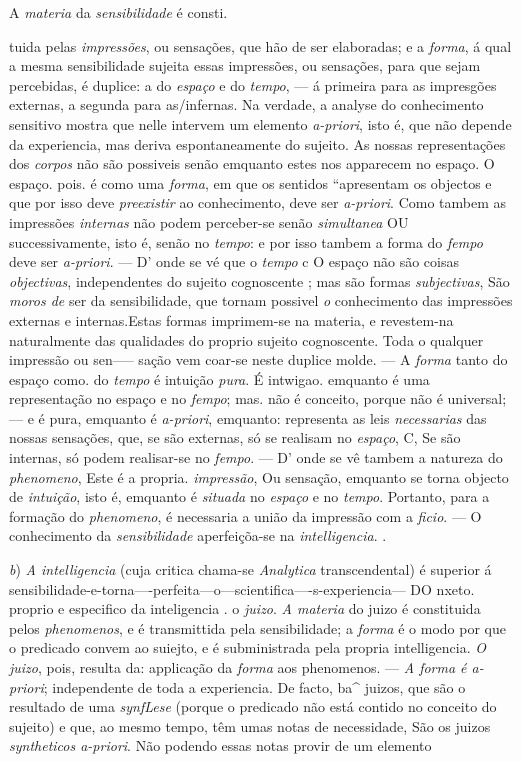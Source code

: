 A \emph{materia} da \emph{sensibilidade} é consti.\par tuida pelas \emph{impressões}, ou sensações, que hão de ser elaboradas; e a \emph{forma}, á qual a mesma sensibilidade sujeita essas impressões, ou sensações, para que sejam percebidas, é duplice: a do \emph{espaço} e do \emph{tempo}, --- á primeira para as impresgões externas, a segunda para as/infernas. Na verdade, a analyse do conhecimento sensitivo mostra que nelle intervem um elemento \emph{a-priori}, isto é, que não depende da experiencia, mas deriva espontaneamente do sujeito. As nossas representações dos \emph{corpos} não são possiveis senão emquanto estes nos apparecem no espaço. O espaço. pois. é como uma \emph{forma}, em que os sentidos “apresentam os objectos e que por isso deve \emph{preexistir} ao conhecimento, deve ser \emph{a-priori}. Como tambem as impressões \emph{internas} não podem perceber-se senão \emph{simultanea} OU successivamente, isto é, senão no \emph{tempo}: e por isso tambem a forma do \emph{fempo} deve ser \emph{a-priori}. --- D' onde se vé que o \emph{tempo} c O espaço não são coisas \emph{objectivas}, independentes do sujeito cognoscente ; mas são formas \emph{subjectivas}, São \emph{moros de} ser da sensibilidade, que tornam possivel \emph{o} conhecimento das impressões externas e internas.Estas formas imprimem-se na materia, e revestem-na naturalmente das qualidades do proprio sujeito cognoscente. Toda o qualquer impressão ou sen----- sação vem coar-se neste duplice molde. --- A \emph{forma} tanto do espaço como. do \emph{tempo} é intuição \emph{pura}. É intwigao. emquanto é uma representação no espaço e no \emph{fempo}; mas. não é conceito, porque não é universal; --- e é pura, emquanto é \emph{a-priori}, emquanto: representa as leis \emph{necessarias} das nossas sensações, que, se são externas, só se realisam no \emph{espaço}, C, Se são internas, só podem realisar-se no \emph{fempo}. --- D' onde se vê tambem a natureza do \emph{phenomeno}, Este é a propria. \emph{impressão}, Ou sensação, emquanto se torna objecto de \emph{intuição}, isto é, emquanto é \emph{situada} no \emph{espaço} e no \emph{tempo}. Portanto, para a formação do \emph{phenomeno}, é necessaria a união da impressão com a \emph{ficio}. --- O conhecimento da \emph{sensibilidade} aperfeiçõa-se na \emph{intelligencia}. .\par \emph{b}) \emph{A intelligencia} (cuja critica chama-se \emph{Analytica} transcendental) é superior á sensibilidade-e-torna----perfeita---o---scientifica----s-experiencia--- DO nxeto. proprio e especifico da inteligencia . o \emph{juizo}. \emph{A materia} do juizo é constituida pelos \emph{phenomenos}, e é transmittida pela sensibilidade; a \emph{forma} é o modo por que o predicado convem ao suiejto, e é subministrada pela propria intelligencia. \emph{O juizo}, pois, resulta da: applicação da \emph{forma} aos phenomenos. --- \emph{A forma é a-priori}; independente de toda a experiencia. De facto, ba\textasciicircum{} juizos, que são o resultado de uma \emph{synfLese} (porque o predicado não está contido no conceito do sujeito) e que, ao mesmo tempo, têm umas notas de necessidade, São os juizos \emph{syntheticos a-priori}. Não podendo essas notas provir de um elemento 